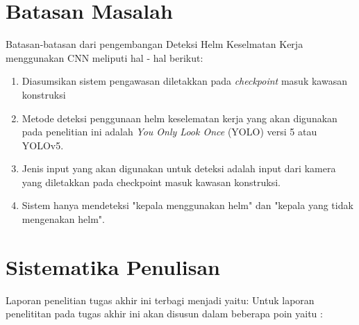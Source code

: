 \section{Batasan Masalah}
\label{sec:batasanmasalah}

Batasan-batasan dari pengembangan Deteksi Helm Keselmatan Kerja menggunakan CNN meliputi hal - hal berikut:

\begin{enumerate}[nolistsep]

  \item Diasumsikan sistem pengawasan diletakkan pada \emph{checkpoint} masuk kawasan konstruksi

  \item Metode deteksi penggunaan helm keselematan kerja yang akan digunakan pada penelitian ini adalah \emph{You Only Look Once} (YOLO) versi 5 atau YOLOv5.

  \item Jenis input yang akan digunakan untuk deteksi adalah input dari kamera yang diletakkan pada checkpoint masuk kawasan konstruksi.
  \item Sistem hanya mendeteksi "kepala menggunakan helm" dan "kepala yang tidak mengenakan helm".

\end{enumerate}

\section{Sistematika Penulisan}
\label{sec:sistematikapenulisan}

Laporan penelitian tugas akhir ini terbagi menjadi \lipsum[1][1-3] yaitu:
Untuk laporan penelititan pada tugas akhir ini akan disusun dalam beberapa poin yaitu :

